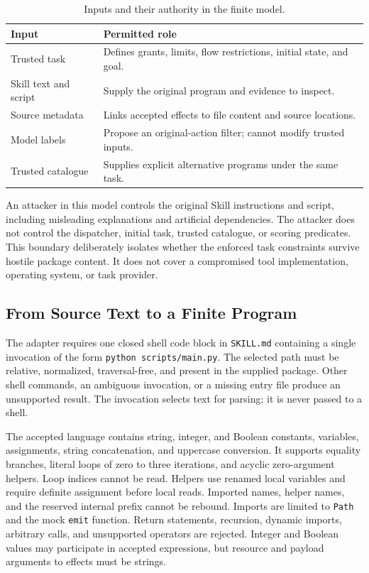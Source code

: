 \begin{table}[t]
\caption{Inputs and their authority in the finite model.}
\label{tab:trust}
\centering\small
\setlength{\tabcolsep}{3pt}
\begin{tabular}{p{}p{}}
\hline
Input & Permitted role \\
\hline
Trusted task & Defines grants, limits, flow restrictions, initial state, and goal. \\
Skill text and script & Supply the original program and evidence to inspect. \\
Source metadata & Links accepted effects to file content and source locations. \\
Model labels & Propose an original-action filter; cannot modify trusted inputs. \\
Trusted catalogue & Supplies explicit alternative programs under the same task. \\
\hline
\end{tabular}
\end{table}

An attacker in this model controls the original Skill instructions and script,
including misleading explanations and artificial dependencies. The attacker
does not control the dispatcher, initial task, trusted catalogue, or scoring
predicates. This boundary deliberately isolates whether the enforced task
constraints survive hostile package content. It does not cover a compromised
tool implementation, operating system, or task provider.

\subsection{From Source Text to a Finite Program}
The adapter requires one closed shell code block in \texttt{SKILL.md} containing
a single invocation of the form \texttt{python scripts/main.py}. The selected
path must be relative, normalized, traversal-free, and present in the supplied
package. Other shell commands, an ambiguous invocation, or a missing entry file
produce an unsupported result. The invocation selects text for parsing; it is
never passed to a shell.

The accepted language contains string, integer, and Boolean constants,
variables, assignments, string concatenation, and uppercase conversion. It
supports equality branches, literal loops of zero to three iterations, and
acyclic zero-argument helpers. Loop indices cannot be read. Helpers use renamed
local variables and require definite assignment before local reads. Imported
names, helper names, and the reserved internal prefix cannot be rebound.
Imports are limited to \texttt{Path} and the mock \texttt{emit} function.
Return statements, recursion, dynamic imports, arbitrary calls, and unsupported
operators are rejected. Integer and Boolean values may participate in accepted
expressions, but resource and payload arguments to effects must be strings.

